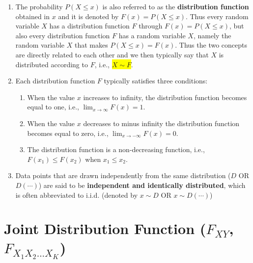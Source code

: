 \begin{enumerate}
    \item The probability $P(X \leq x)$ is also referred to as the \textbf{distribution function} obtained in $x$ and it is denoted by $F(x) = P(X \leq x)$.
    Thus every random variable $X$ has a distribution function $F$ through $F(x) = P(X \leq x)$, but also every distribution function $F$ has a random variable $X$, namely the random variable $X$ that makes $P(X \leq x) = F(x)$.
    Thus the two concepts are directly related to each other and we then typically say that $X$ is distributed according to $F$, i.e., \colorbox{yellow}{$X \sim F$}.
    \hfill \cite{statistics/book/Statistics-for-Data-Scientists/Maurits-Kaptein}

    \item Each distribution function $F$ typically satisfies three conditions:
    \begin{enumerate}
        \item When the value $x$ increases to infinity, the distribution function becomes equal to one, i.e., $\lim _{x\to \infty} F(x) = 1$.
        \hfill \cite{statistics/book/Statistics-for-Data-Scientists/Maurits-Kaptein}

        \item When the value $x$ decreases to minus infinity the distribution function becomes equal to zero, i.e., $\lim _{x\to -\infty} F(x) = 0$.
        \hfill \cite{statistics/book/Statistics-for-Data-Scientists/Maurits-Kaptein}

        \item The distribution function is a non-decreasing function, i.e., $F(x_1) \leq F(x_2)$ when $x_1 \leq x_2$.
        \hfill \cite{statistics/book/Statistics-for-Data-Scientists/Maurits-Kaptein}
    \end{enumerate}


    \item Data points that are drawn independently from the same distribution ($D$ OR $D(\cdots)$) are said to be \textbf{independent and identically distributed}, which is often abbreviated to i.i.d. (denoted by $x \sim D$ OR $x \sim D(\cdots)$)
    \hfill \cite{ml/book/Pattern-Recognition-And-Machine-Learning/Christopher-M-Bishop}

\end{enumerate}








\section{Joint Distribution Function ($F _{X Y}$, $F _{X_1 X_2 ... X _K} $)}

